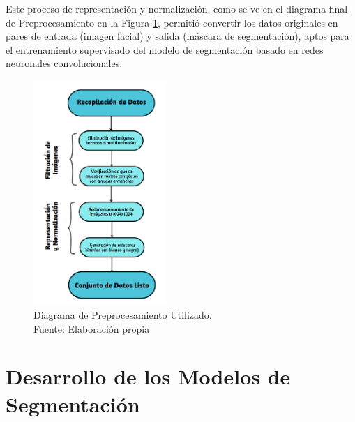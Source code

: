 Este proceso de representación y normalización, como se ve en el diagrama final de Preprocesamiento en la Figura \ref{4:fig3}, permitió convertir los datos originales en pares de entrada (imagen facial) y salida (máscara de segmentación), aptos para el entrenamiento supervisado del modelo de segmentación basado en redes neuronales convolucionales.

\begin{figure}[h]
	\begin{center}
		\includegraphics[width=0.45\textwidth]{4/figures/diagrama final prepo.png}
		\caption[Diagrama de Preprocesamiento Utilizado]{Diagrama de Preprocesamiento Utilizado.\\
		Fuente: Elaboración propia}
		\label{4:fig3}
	\end{center}
\end{figure}
\newpage
\section{Desarrollo de los Modelos de Segmentación}

